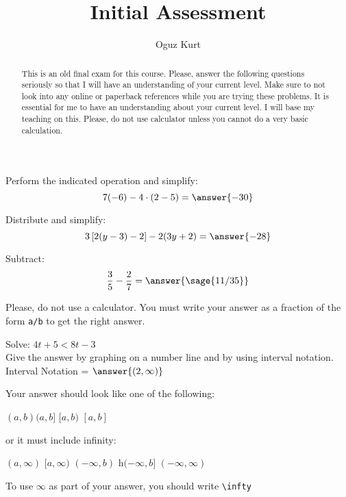 \documentclass{ximera}
\title{Initial Assessment}
\author{Oguz Kurt}
\begin{document}
\begin{abstract}
This is an old final exam for this course. Please, answer the following questions seriously so that I will have an understanding of your current level. Make sure to not look into any online or paperback references while you are trying these problems. It is essential for me to have an understanding about your current level. I will base my teaching on this. Please, do not use calculator unless you cannot do a very basic calculation. 
\end{abstract}
\maketitle

\begin{problem}
Perform the indicated operation and simplify: \hspace{1cm} 
$$ 7(-6) - 4 \cdot (2 - 5) =\answer{-30}$$

\end{problem}



\begin{problem}
Distribute and simplify: \hspace{1cm} 
$$3 \left [ 2 (y - 3) - 2 \right ] - 2 (3y + 2)=\answer{-28}$$

\end{problem}



\begin{problem}
Subtract: \hspace{1cm} 
$$\displaystyle \frac{3}{5} - \frac{2}{7}=\answer{\sage{11/35}}$$
\begin{hint}
    Please, do not use a calculator. 
    You must write your answer as a fraction of the form \verb|a/b| to get the right answer. 
\end{hint}
\end{problem}



\begin{problem}
Solve: \hspace{1cm} $4t + 5 < 8 t -3$\\

Give the answer by graphing on a number line and by using interval notation. \\

Interval Notation = $\answer{(2,\infty)}$

\begin{hint}
Your answer should look like one of the following:

\hfill $(a,b)$\hfill $(a,b]$ \hfill $[a,b)$ \hfill $[a,b]$ \hfill  \,

or it must include infinity:

\hfill $(a,\infty)$ \hfill $[a,\infty)$ \hfill  $(-\infty,b)$ \hfill h$(-\infty,b]$ \hfill $(-\infty, \infty)$ \hfill \,

To use $\infty$ as part of your answer, you should write \verb|\infty|
\end{hint} 



\end{problem}
\end{document}
